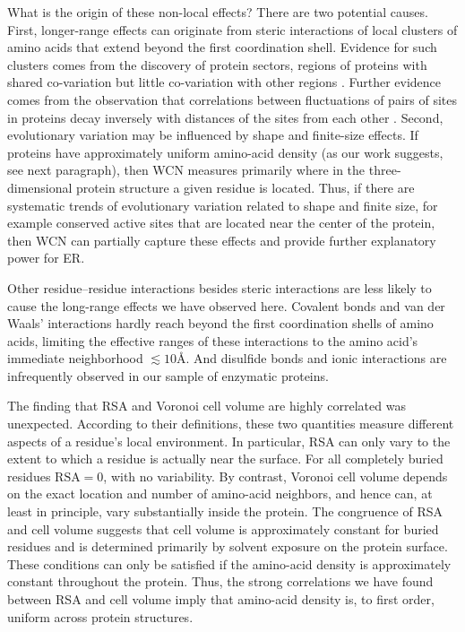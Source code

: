 \documentclass[12pt]{article}
\begin{document}
What is the origin of these non-local effects? There are two potential causes. First, longer-range effects can originate from steric interactions of local clusters of amino acids that extend beyond the first coordination shell. Evidence for such clusters comes from the discovery of protein sectors, regions of proteins with shared co-variation but little co-variation with other regions \cite{Halabietal2009}. Further evidence comes from the observation that correlations between fluctuations of pairs of sites in proteins decay inversely with distances of the sites from each other \cite{dehouck_effective_2013}. Second, evolutionary variation may be influenced by shape and finite-size effects. If proteins have approximately uniform amino-acid density (as our work suggests, see next paragraph), then WCN measures primarily where in the three-dimensional protein structure a given residue is located. Thus, if there are systematic trends of evolutionary variation related to shape and finite size, for example conserved active sites that are located near the center of the protein, then WCN can partially capture these effects and provide further explanatory power for ER.

Other residue--residue interactions besides steric interactions are less likely to cause the long-range effects we have observed here. Covalent bonds and van der Waals' interactions hardly reach beyond the first coordination shells of amino acids, limiting the effective ranges of these interactions to the amino acid's immediate neighborhood $\lesssim10$\AA. And disulfide bonds and ionic interactions are infrequently observed in our sample of enzymatic proteins.

The finding that RSA and Voronoi cell volume are highly correlated was unexpected. According to their definitions, these two quantities measure different aspects of a residue's local environment. In particular, RSA can only vary to the extent to which a residue is actually near the surface. For all completely buried residues $\text{RSA}=0$, with no variability. By contrast, Voronoi cell volume depends on the exact location and number of amino-acid neighbors, and hence can, at least in principle, vary substantially inside the protein. The congruence of RSA and cell volume suggests that cell volume is approximately constant for buried residues and is determined primarily by solvent exposure on the protein surface. These conditions can only be satisfied if the amino-acid density is approximately constant throughout the protein. Thus, the strong correlations we have found between RSA and cell volume imply that amino-acid density is, to first order, uniform across protein structures.
\end{document}

